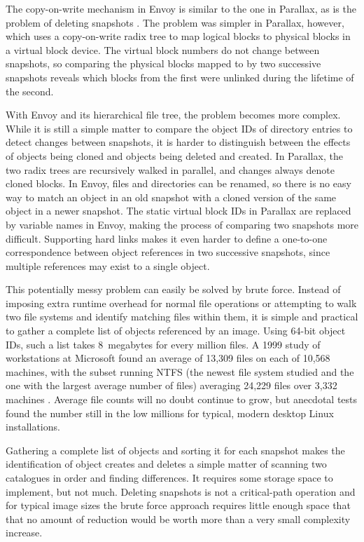 The copy-on-write mechanism in Envoy is similar to the one in Parallax, as is the problem of deleting snapshots \cite{warfield}. The problem was simpler in Parallax, however, which uses a copy-on-write radix tree to map logical blocks to physical blocks in a virtual block device. The virtual block numbers do not change between snapshots, so comparing the physical blocks mapped to by two successive snapshots reveals which blocks from the first were unlinked during the lifetime of the second.

With Envoy and its hierarchical file tree, the problem becomes more complex. While it is still a simple matter to compare the object IDs of directory entries to detect changes between snapshots, it is harder to distinguish between the effects of objects being cloned and objects being deleted and created. In Parallax, the two radix trees are recursively walked in parallel, and changes always denote cloned blocks. In Envoy, files and directories can be renamed, so there is no easy way to match an object in an old snapshot with a cloned version of the same object in a newer snapshot. The static virtual block IDs in Parallax are replaced by variable names in Envoy, making the process of comparing two snapshots more difficult. Supporting hard links makes it even harder to define a one-to-one correspondence between object references in two successive snapshots, since multiple references may exist to a single object.

This potentially messy problem can easily be solved by brute force. Instead of imposing extra runtime overhead for normal file operations or attempting to walk two file systems and identify matching files within them, it is simple and practical to gather a complete list of objects referenced by an image. Using 64-bit object IDs, such a list takes 8~megabytes for every million files. A 1999 study of workstations at Microsoft found an average of 13,309 files on each of 10,568 machines, with the subset running NTFS (the newest file system studied and the one with the largest average number of files) averaging 24,229 files over 3,332 machines \cite{douceur99}. Average file counts will no doubt continue to grow, but anecdotal tests found the number still in the low millions for typical, modern desktop Linux installations.

Gathering a complete list of objects and sorting it for each snapshot makes the identification of object creates and deletes a simple matter of scanning two catalogues in order and finding differences. It requires some storage space to implement, but not much. Deleting snapshots is not a critical-path operation and for typical image sizes the brute force approach requires little enough space that that no amount of reduction would be worth more than a very small complexity increase.

